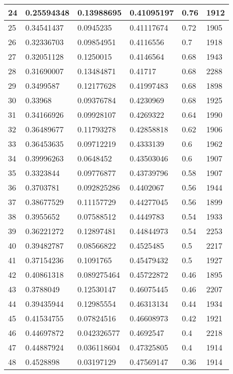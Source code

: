 \begin{longtable}{|l|l|l|l|l|l|}
24 & 0.25594348 & 0.13988695 & 0.41095197 & 0.76 & 1912 \\ \hline 
25 & 0.34541437 & 0.0945235 & 0.41117674 & 0.72 & 1905 \\ \hline 
26 & 0.32336703 & 0.09854951 & 0.4116556 & 0.7 & 1918 \\ \hline 
27 & 0.32051128 & 0.1250015 & 0.4146564 & 0.68 & 1943 \\ \hline 
28 & 0.31690007 & 0.13484871 & 0.41717 & 0.68 & 2288 \\ \hline 
29 & 0.3499587 & 0.12177628 & 0.41997483 & 0.68 & 1898 \\ \hline 
30 & 0.33968 & 0.09376784 & 0.4230969 & 0.68 & 1925 \\ \hline 
31 & 0.34166926 & 0.09928107 & 0.4269322 & 0.64 & 1990 \\ \hline 
32 & 0.36489677 & 0.11793278 & 0.42858818 & 0.62 & 1906 \\ \hline 
33 & 0.36453635 & 0.09712219 & 0.4333139 & 0.6 & 1962 \\ \hline 
34 & 0.39996263 & 0.0648452 & 0.43503046 & 0.6 & 1907 \\ \hline 
35 & 0.3323844 & 0.09776877 & 0.43739796 & 0.58 & 1907 \\ \hline 
36 & 0.3703781 & 0.092825286 & 0.4402067 & 0.56 & 1944 \\ \hline 
37 & 0.38677529 & 0.11157729 & 0.44277045 & 0.56 & 1899 \\ \hline 
38 & 0.3955652 & 0.07588512 & 0.4449783 & 0.54 & 1933 \\ \hline 
39 & 0.36221272 & 0.12897481 & 0.44844973 & 0.54 & 2253 \\ \hline 
40 & 0.39482787 & 0.08566822 & 0.4525485 & 0.5 & 2217 \\ \hline 
41 & 0.37154236 & 0.1091765 & 0.45479432 & 0.5 & 1927 \\ \hline 
42 & 0.40861318 & 0.089275464 & 0.45722872 & 0.46 & 1895 \\ \hline 
43 & 0.3788049 & 0.12530147 & 0.46075445 & 0.46 & 2207 \\ \hline 
44 & 0.39435944 & 0.12985554 & 0.46313134 & 0.44 & 1934 \\ \hline 
45 & 0.41534755 & 0.07824516 & 0.46608973 & 0.42 & 1921 \\ \hline 
46 & 0.44697872 & 0.042326577 & 0.4692547 & 0.4 & 2218 \\ \hline 
47 & 0.44887924 & 0.036118604 & 0.47325805 & 0.4 & 1914 \\ \hline 
48 & 0.4528898 & 0.03197129 & 0.47569147 & 0.36 & 1914 \\ \hline 

\end{longtable}
